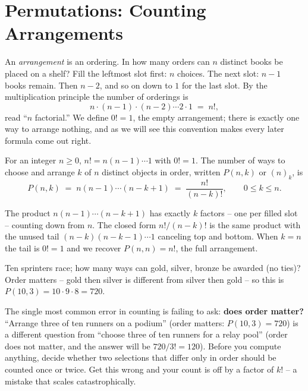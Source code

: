 \section{Permutations: Counting Arrangements}
\label{ch2:permutations}

An \emph{arrangement} is an ordering. In how many orders can $n$ distinct books be placed
on a shelf? Fill the leftmost slot first: $n$ choices. The next slot: $n-1$ books remain.
Then $n-2$, and so on down to $1$ for the last slot. By the multiplication principle the
number of orderings is
\[
  n \cdot (n-1) \cdot (n-2) \cdots 2 \cdot 1 \;=\; n!,
\]
read ``$n$ factorial.'' We define $0! = 1$, the empty arrangement; there is exactly one
way to arrange nothing, and as we will see this convention makes every later formula come
out right.

\begin{definition}
\label{ch2:def-perm}
For an integer $n \ge 0$, $n! = n(n-1)\cdots 1$ with $0! = 1$. The number of ways to choose
and arrange $k$ of $n$ distinct objects in order, written $P(n,k)$ or $(n)_k$, is
\[
  P(n,k) \;=\; n(n-1)\cdots(n-k+1) \;=\; \frac{n!}{(n-k)!}, \qquad 0 \le k \le n.
\]
\end{definition}

The product $n(n-1)\cdots(n-k+1)$ has exactly $k$ factors -- one per filled slot -- counting
down from $n$. The closed form $n!/(n-k)!$ is the same product with the unused tail
$(n-k)(n-k-1)\cdots 1$ canceling top and bottom. When $k = n$ the tail is $0! = 1$ and we
recover $P(n,n) = n!$, the full arrangement.

\begin{example}
\label{ch2:ex-podium}
Ten sprinters race; how many ways can gold, silver, bronze be awarded (no ties)?
Order matters -- gold then silver is different from silver then gold -- so this is
$P(10,3) = 10 \cdot 9 \cdot 8 = 720$.
\end{example}

\begin{trapbox}
The single most common error in counting is failing to ask: \textbf{does order matter?}
``Arrange three of ten runners on a podium'' (order matters: $P(10,3)=720$) is a different
question from ``choose three of ten runners for a relay pool'' (order does not matter, and
the answer will be $720/3! = 120$). Before you compute anything, decide whether two
selections that differ only in order should be counted once or twice. Get this wrong and
your count is off by a factor of $k!$ -- a mistake that scales catastrophically.
\end{trapbox}


